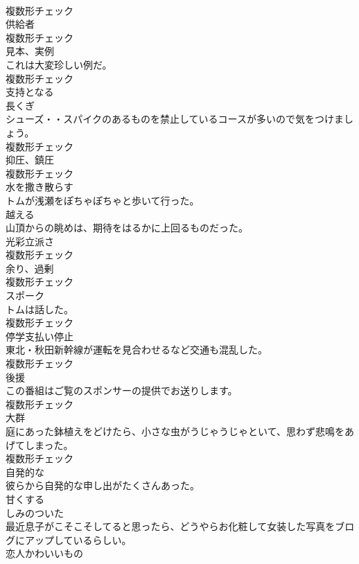 \documentclass[8pt]{extreport}
\begin{document}
\begin{CJK}{UTF8}{min}
\\	複数形チェック
\\	[名詞]	供給者	
\\	複数形チェック
\\	[名詞]	見本、実例	
\\	これは大変珍しい例だ。	
\\	複数形チェック
\\	[形容詞]	支持となる	
\\	[名詞]	⻑くぎ	
\\	シューズ・・スパイクのあるものを禁止しているコースが多いので気をつけましょう。	
\\	複数形チェック
\\	[名詞]	抑圧、鎮圧	
\\	複数形チェック
\\	[動詞]	水を撒き散らす	
\\	トムが浅瀬をぽちゃぽちゃと歩いて行った。	
\\	[動詞]	越える	
\\	山頂からの眺めは、期待をはるかに上回るものだった。	
\\	[名詞]	光彩立派さ	
\\	複数形チェック
\\	[名詞]	余り、過剰	
\\	複数形チェック
\\	[名詞]	スポーク	
\\	トムは話した。	
\\	複数形チェック
\\	[名詞]	停学支払い停止	
\\	東北・秋田新幹線が運転を見合わせるなど交通も混乱した。	
\\	複数形チェック
\\	[名詞]	後援	
\\	この番組はご覧のスポンサーの提供でお送りします。	
\\	複数形チェック
\\	[名詞]	大群	
\\	庭にあった鉢植えをどけたら、小さな虫がうじゃうじゃといて、思わず悲鳴をあげてしまった。	
\\	複数形チェック
\\	[形容詞]	自発的な	
\\	彼らから自発的な申し出がたくさんあった。	
\\	[動詞]	甘くする	
\\	[形容詞]	しみのついた	
\\	最近息子がこそこそしてると思ったら、どうやらお化粧して女装した写真をブログにアップしているらしい。	
\\	[名詞]	恋人かわいいもの	

\end{CJK}
\end{document}
